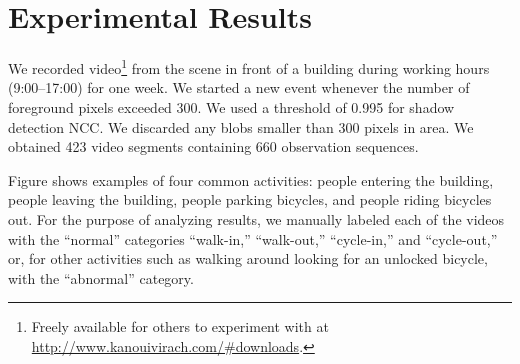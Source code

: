 \section{Experimental Results}
\label{incremental-results}

We recorded video\footnote{Freely available for others to experiment 
with at \url{http://www.kanouivirach.com/#downloads}.}
from the scene in front of a building during working hours
(9:00--17:00) for one week.  We started a new event whenever the
number of foreground pixels exceeded 300.  We used a threshold of
0.995 for shadow detection NCC.  We discarded any blobs smaller than
300 pixels in area. We obtained 423 video segments containing 660
observation sequences.

Figure \DIFdelbegin \DIFdel{\ref{fig:example-behavior} }\DIFdelend \DIFaddbegin \DIFadd{\ref{fig:batch-example-behavior} }\DIFaddend shows examples of four common
activities: people entering the building, people leaving the building,
people parking bicycles, and people riding bicycles out\DIFaddbegin {}\DIFaddend . 
For the purpose of analyzing results, we manually labeled each of the videos
with the ``normal'' categories ``walk-in,'' ``walk-out,''
``cycle-in,'' and ``cycle-out,'' or, for other activities such as
walking around looking for an unlocked bicycle, with the ``abnormal''
category.

